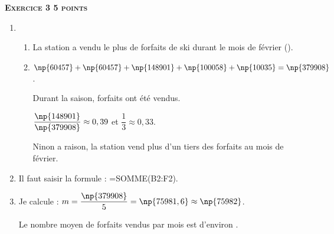 \textbf{\textsc{Exercice 3 \hfill 5 points}}

\medskip

\begin{enumerate}
\item 
	\begin{enumerate}
		\item La station a vendu le plus de forfaits de ski durant le mois de février ().
		\item $\np{60457} + \np{60457} + \np{148901} + \np{100058} + \np{10035} = \np{379908}$.
		
Durant la saison,  forfaits ont été vendus.
		
$\dfrac{\np{148901}}{\np{379908}} \approx 0,39$ et $\dfrac{1}{3} \approx  0,33$.

Ninon a raison, la station vend plus d'un tiers des forfaits au mois de février.
	\end{enumerate}
\item Il faut saisir la formule : =SOMME(B2:F2).
\item Je calcule : $m = \dfrac{\np{379908}}{5} = \np{75981,6} \approx  \np{75982}$.
	
Le nombre moyen de forfaits vendus par mois est d'environ .
\end{enumerate}


\vspace{0,5cm}

